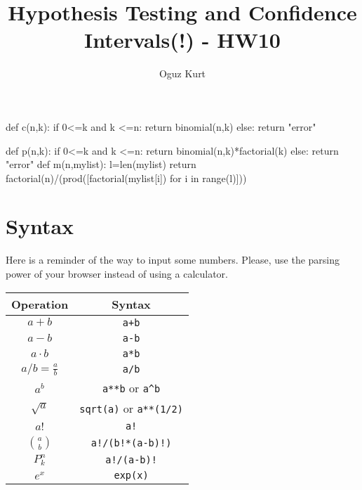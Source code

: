 \documentclass{ximera}
\title{Hypothesis Testing and Confidence Intervals(!) - HW10}
\author{Oguz Kurt}
\begin{document}
\begin{abstract}
\empty
\end{abstract}
\maketitle
\begin{sagesilent}
def c(n,k):
    if 0<=k and k <=n:
        return binomial(n,k)
    else:
        return "error"

def p(n,k):
    if 0<=k and k <=n:
        return binomial(n,k)*factorial(k)
    else:
        return "error"
def m(n,mylist):
    l=len(mylist)
    return factorial(n)/(prod([factorial(mylist[i]) for i in range(l)]))
\end{sagesilent}



\section*{Syntax}
Here is a reminder of the way to input some numbers. Please, use the parsing power of your browser instead of using a calculator.

\hspace{0.5cm}


\begin{tabular}{c|c}
Operation & Syntax  
\\
\hline
$a+b$ & {\color{red} \verb!a+b!} 
\\
\hline
$a- b$ & {\color{red} \verb!a-b!} 
\\
\hline
$a\cdot b$ & {\color{red} \verb!a*b! } 
\\
\hline
$a/b=\frac{a}{b}$ & {\color{red} \verb!a/b!}
\\
\hline
$a^b$ & {\color{red} \verb|a**b| or \verb|a^b|} 
\\
\hline
$\sqrt{a}$ & {\color{red} \verb|sqrt(a)| or \verb|a**(1/2)|} 
\\
\hline
$a!$ & {\color{red} \verb|a!|} 
\\
\hline
$\binom{a}{b}$ & {\color{red} \verb|a!/(b!*(a-b)!)|}
\\
\hline
$P_k^n$ & {\color{red} \verb|a!/(a-b)!|}
\\
\hline
$e^x$ & {\color{red} \verb|exp(x)|}
\\
\end{tabular}

\hspace{1cm}
\end{document}
